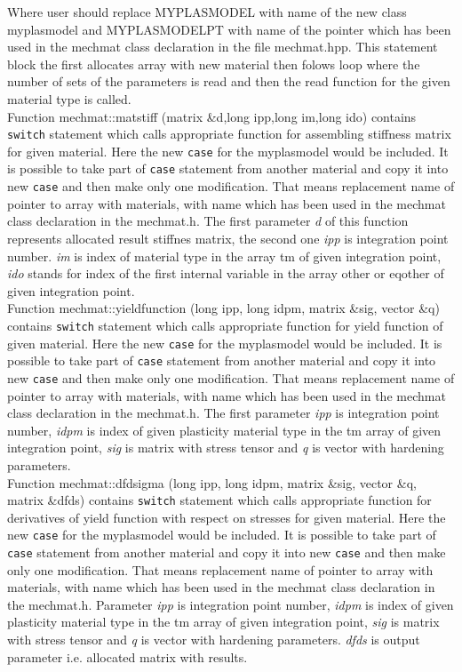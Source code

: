 Where user should replace MYPLASMODEL with name of the new class {\sf myplasmodel} and MYPLASMODELPT with
name of the pointer which has been used in the {\sf mechmat} class declaration in the file mechmat.hpp. This
statement block the first allocates array with new material then folows loop where the number of sets of the
parameters is read and then the {\sf read} function for the given material type is called.\\

Function {\sf mechmat::matstiff (matrix \&d,long ipp,long im,long ido)} contains {\tt switch} statement which calls appropriate function
for assembling stiffness matrix for given material. Here the new {\tt case} for the  {\sf myplasmodel} would be included.
It is possible to take part of {\tt case} statement from another material and copy it into new {\tt case} and then
make only one modification. That means replacement name of pointer to array with materials, with name which has been
used in the {\sf mechmat} class declaration in the mechmat.h. The first parameter {\it d} of this function
represents allocated result stiffnes matrix, the second one {\it ipp} is integration point number. {\it im} is index of
material type in the array {\sf tm} of given integration point, {\it ido} stands for index of the first internal variable
in the array {\sf other} or {\sf eqother} of given integration point.\\

Function {\sf mechmat::yieldfunction (long ipp, long idpm, matrix \&sig, vector \&q)} contains {\tt switch} statement which calls
appropriate function for yield function of given material. Here the new {\tt case} for the  {\sf myplasmodel} would
be included. It is possible to take part of {\tt case} statement from another material and copy it into new {\tt case}
and then make only one modification. That means replacement name of pointer to array with materials, with name which
has been used in the {\sf mechmat} class declaration in the mechmat.h. The first parameter {\it ipp} is integration
point number, {\it idpm} is index of given plasticity material type in the {\sf tm} array of given integration point, 
{\it sig} is matrix with stress tensor and {\it q} is vector with hardening parameters.\\

Function {\sf mechmat::dfdsigma (long ipp, long idpm, matrix \&sig, vector \&q, matrix \&dfds)} contains {\tt switch} statement
which calls appropriate function for derivatives of yield function with respect on stresses for given material. Here
the new {\tt case} for the  {\sf myplasmodel} would be included. It is possible to take part of {\tt case} statement
from another material and copy it into new {\tt case} and then make only one modification. That means replacement name
of pointer to array with materials, with name which has been used in the {\sf mechmat} class declaration
in the mechmat.h. Parameter {\it ipp} is integration point number, {\it idpm} is index of given plasticity material type 
in the {\sf tm} array of given integration point, {\it sig} is matrix with stress tensor and {\it q} is vector with hardening parameters.
{\it dfds} is output parameter i.e. allocated matrix with results.\\

